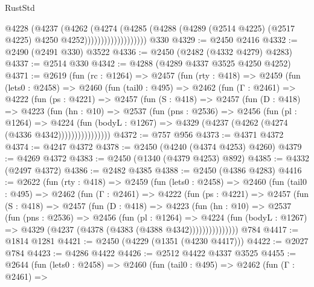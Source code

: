 \begin{lexlean}{RustStd}
\begin{coremodule}
                            @4228
                              (@4237
                                (@4262
                                  (@4274
                                    (@4285
                                      (@4288
                                        (@4289
                                          (@2514 @4225)
                                          (@2517 @4225)
                                          @4250
                                          @4252)))))))))))))))))))
    @330
@4329 := @2450 @2416
@4332 := @2490 (@2491 @330) @3522
@4336 := @2450 (@2482 (@4332 @4279) @4283)
@4337 := @2514 @330
@4342 := @4288 (@4289 @4337 @3525 @4250 @4252)
@4371 := @2619
    (fun (rc : @1264) =>
    @2457
      (fun (rty : @418) =>
      @2459
        (fun (lets0 : @2458) =>
        @2460
          (fun (tail0 : @495) =>
          @2462
            (fun (Γ : @2461) =>
            @4222
              (fun (ps : @4221) =>
              @2457
                (fun (S : @418) =>
                @2457
                  (fun (D : @418) =>
                  @4223
                    (fun (hn : @10) =>
                    @2537
                      (fun (pns : @2536) =>
                      @2456
                        (fun (pl : @1264) =>
                        @4224
                          (fun (bodyL : @1267) =>
                          @4329 (@4237 (@4262 (@4274 (@4336 @4342))))))))))))))))
@4372 := @757 @956
@4373 := @4371 @4372
@4374 := @4247 @4372
@4378 := @2450 (@4240 (@4374 @4253) @4260)
@4379 := @4269 @4372
@4383 := @2450 (@1340 (@4379 @4253) @892)
@4385 := @4332 (@2497 @4372)
@4386 := @2482 @4385
@4388 := @2450 (@4386 @4283)
@4416 := @2622
    (fun (rty : @418) =>
    @2459
      (fun (lets0 : @2458) =>
      @2460
        (fun (tail0 : @495) =>
        @2462
          (fun (Γ : @2461) =>
          @4222
            (fun (ps : @4221) =>
            @2457
              (fun (S : @418) =>
              @2457
                (fun (D : @418) =>
                @4223
                  (fun (hn : @10) =>
                  @2537
                    (fun (pns : @2536) =>
                    @2456
                      (fun (pl : @1264) =>
                      @4224
                        (fun (bodyL : @1267) =>
                        @4329 (@4237 (@4378 (@4383 (@4388 @4342)))))))))))))))
    @784
@4417 := @1814 @1281
@4421 := @2450 (@4229 (@1351 (@4230 @4417)))
@4422 := @2027 @784
@4423 := @4286 @4422
@4426 := @2512 @4422 @4337 @3525
@4455 := @2644
    (fun (lets0 : @2458) =>
    @2460
      (fun (tail0 : @495) =>
      @2462
        (fun (Γ : @2461) =>

\end{coremodule}
\end{lexlean}
